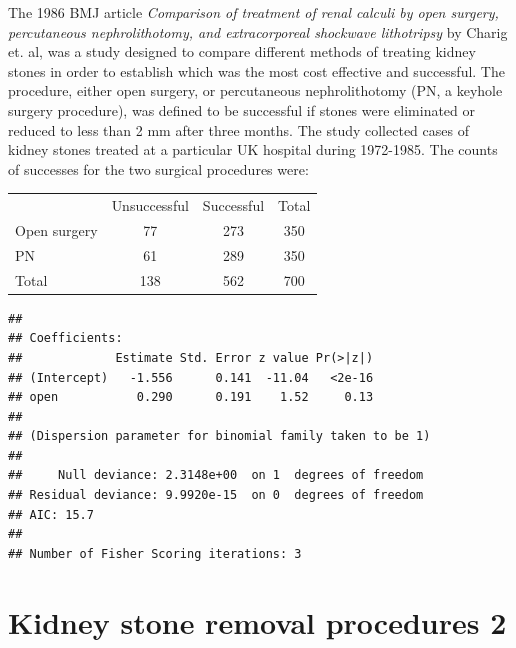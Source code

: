 \documentclass[10pt]{beamer}\usepackage[]{graphicx}\usepackage[]{color}
\makeatletter
\newenvironment{kframe}{%
 \def\at@end@of@kframe{}%
 \ifinner\ifhmode%
  \def\at@end@of@kframe{\end{minipage}}%
  \begin{minipage}{\columnwidth}%
 \fi\fi%
 \def\FrameCommand##1{\hskip\@totalleftmargin \hskip-\fboxsep
 \colorbox{shadecolor}{##1}\hskip-\fboxsep
     \hskip-\linewidth \hskip-\@totalleftmargin \hskip\columnwidth}%
 \MakeFramed {\advance\hsize-\width
   \@totalleftmargin\z@ \linewidth\hsize
   \@setminipage}}%
 {\par\unskip\endMakeFramed%
 \at@end@of@kframe}
\newenvironment{knitrout}{}{} %
\makeatother
\begin{document}
\begin{frame}
\vspace{-.91in}
	\tiny
The 1986 BMJ article \textit{Comparison of treatment of renal calculi by open surgery, percutaneous nephrolithotomy, and extracorporeal shockwave lithotripsy} by Charig et. al, was a study designed to compare different methods of treating kidney stones in order to establish which was the most cost effective and successful. The procedure, either open surgery, or percutaneous nephrolithotomy (PN, a keyhole surgery procedure), was defined to be successful if stones were eliminated or reduced to less than 2 mm after three months. The study collected cases of kidney stones treated at a particular UK hospital during 1972-1985. The counts of successes for the two surgical procedures were:
\vspace{-.11in}
\begin{table}[h]
	\centering
	\begin{tabular}{lcc|c}
		& Unsuccessful &  Successful & Total\\
		Open surgery & 77 & 273 & 350 \\
		PN & 61 & 289 & 350 \\
		\hline
		Total & 138 & 562 & 700
	\end{tabular}
\end{table}
\vspace{-.21in}
\begin{knitrout}\tiny
{}\color{fgcolor}\begin{kframe}
\begin{verbatim}
## 
## Coefficients:
##             Estimate Std. Error z value Pr(>|z|)
## (Intercept)   -1.556      0.141  -11.04   <2e-16
## open           0.290      0.191    1.52     0.13
## 
## (Dispersion parameter for binomial family taken to be 1)
## 
##     Null deviance: 2.3148e+00  on 1  degrees of freedom
## Residual deviance: 9.9920e-15  on 0  degrees of freedom
## AIC: 15.7
## 
## Number of Fisher Scoring iterations: 3
\end{verbatim}
\end{kframe}
\end{knitrout}

\end{frame}


\section{Kidney stone removal procedures 2}
\end{document}
